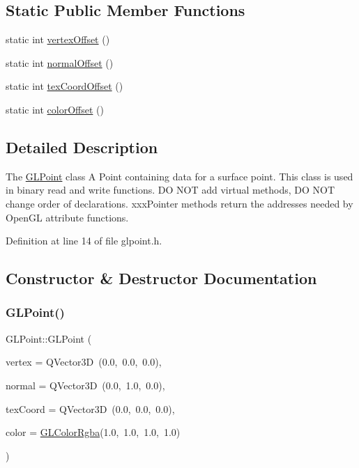 \subsection*{Static Public Member Functions}
\begin{DoxyCompactItemize}
\item 
static int \mbox{\hyperlink{class_g_l_point_ac45fdd4dc914c102ab013eb4d984f994}{vertex\+Offset}} ()
\item 
static int \mbox{\hyperlink{class_g_l_point_a7625e2028fceb48d927236a03bfc3b75}{normal\+Offset}} ()
\item 
static int \mbox{\hyperlink{class_g_l_point_ac94d3bf766f3f81da117997950844b21}{tex\+Coord\+Offset}} ()
\item 
static int \mbox{\hyperlink{class_g_l_point_a91ba1c6cd816cb5e1e11a233ea0d1328}{color\+Offset}} ()
\end{DoxyCompactItemize}


\subsection{Detailed Description}
The \mbox{\hyperlink{class_g_l_point}{G\+L\+Point}} class A Point containing data for a surface point. This class is used in binary read and write functions. DO N\+OT add virtual methods, DO N\+OT change order of declarations. xxx\+Pointer methods return the addresses needed by Open\+GL attribute functions. 

Definition at line 14 of file glpoint.\+h.



\subsection{Constructor \& Destructor Documentation}
\mbox{\label{class_g_l_point_a41a36ef6e07c906a279c866e86f2f241}} 
\subsubsection{\texorpdfstring{GLPoint()}{GLPoint()}}
{\footnotesize\ttfamily G\+L\+Point\+::\+G\+L\+Point (\begin{DoxyParamCaption}\item[{const Q\+Vector3D \&}]{vertex = {\ttfamily QVector3D~(0.0,~0.0,~0.0)},  }\item[{const Q\+Vector3D \&}]{normal = {\ttfamily QVector3D~(0.0,~1.0,~0.0)},  }\item[{const Q\+Vector3D \&}]{tex\+Coord = {\ttfamily QVector3D~(0.0,~0.0,~0.0)},  }\item[{const \mbox{\hyperlink{class_g_l_color_rgba}{G\+L\+Color\+Rgba}} \&}]{color = {\ttfamily \mbox{\hyperlink{class_g_l_color_rgba}{G\+L\+Color\+Rgba}}(1.0,~1.0,~1.0,~1.0)} }\end{DoxyParamCaption})}



